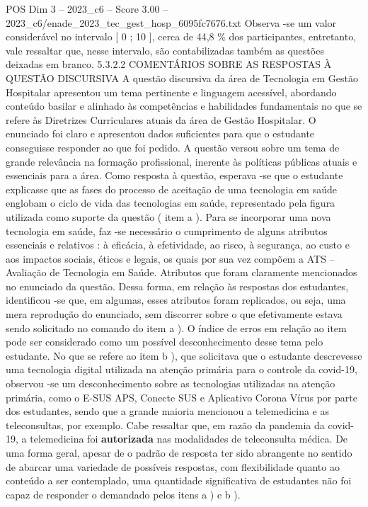 \begin{textsample}{POS Dim 3 – 2023\_c6 – Score 3.00 – 2023\_c6/enade\_2023\_tec\_gest\_hosp\_6095fc7676.txt}
Observa -se um valor considerável no intervalo [ 0 ; 10 ], cerca de 44,8 \% dos participantes, entretanto, vale ressaltar que, nesse intervalo, são contabilizadas também as questões deixadas em branco. 5.3.2.2 COMENTÁRIOS SOBRE AS RESPOSTAS À QUESTÃO DISCURSIVA A questão discursiva da área de Tecnologia em Gestão Hospitalar apresentou um tema pertinente e linguagem acessível, abordando conteúdo basilar e alinhado às competências e habilidades fundamentais no que se refere às Diretrizes Curriculares atuais da área de Gestão Hospitalar.
O enunciado foi claro e apresentou dados suficientes para que o estudante conseguisse responder ao que foi pedido.
A questão versou sobre um tema de grande relevância na formação profissional, inerente às políticas públicas atuais e essenciais para a área.
Como resposta à questão, esperava -se que o estudante explicasse que as fases do processo de aceitação de uma tecnologia em saúde englobam o ciclo de vida das tecnologias em saúde, representado pela figura utilizada como suporte da questão ( item a ).
Para se incorporar uma nova tecnologia em saúde, faz -se necessário o cumprimento de alguns atributos essenciais e relativos : à eficácia, à efetividade, ao risco, à segurança, ao custo e aos impactos sociais, éticos e legais, os quais por sua vez compõem a ATS – Avaliação de Tecnologia em Saúde.
Atributos que foram claramente mencionados no enunciado da questão.
Dessa forma, em relação às respostas dos estudantes, identificou -se que, em algumas, esses atributos foram replicados, ou seja, uma mera reprodução do enunciado, sem discorrer sobre o que efetivamente estava sendo solicitado no comando do item a ).
O índice de erros em relação ao item pode ser considerado como um possível desconhecimento desse tema pelo estudante.
No que se refere ao item b ), que solicitava que o estudante descrevesse uma tecnologia digital utilizada na atenção primária para o controle da covid-19, observou -se um desconhecimento sobre as tecnologias utilizadas na atenção primária, como o E-SUS APS, Conecte SUS e Aplicativo Corona Vírus por parte dos estudantes, sendo que a grande maioria mencionou a telemedicina e as teleconsultas, por exemplo.
Cabe ressaltar que, em razão da pandemia da covid-19, a telemedicina foi \textbf{autorizada} nas modalidades de teleconsulta médica.
De uma forma geral, apesar de o padrão de resposta ter sido abrangente no sentido de abarcar uma variedade de possíveis respostas, com flexibilidade quanto ao conteúdo a ser contemplado, uma quantidade significativa de estudantes não foi capaz de responder o demandado pelos itens a ) e b ).

\end{textsample}
